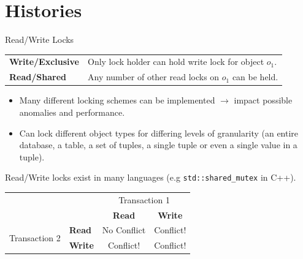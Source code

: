 \section{Histories}
\begin{definitionbox}{Read/Write Locks}
    \begin{center}
        \begin{tabular}{l p{}}
            \textbf{Write/Exclusive}  & Only lock holder can hold write lock for object $o_1$. \\
            \textbf{Read/Shared}  & Any number of other read locks on $o_1$ can be held. \\
        \end{tabular}
    \end{center}
    \begin{itemize}
        \item Many different locking schemes can be implemented $\to$ impact possible anomalies and performance.
        \item Can lock different object types for differing levels of granularity (an entire database, a table, a set of tuples, a single tuple or even a single value in a tuple).
    \end{itemize}
    Read/Write locks exist in many languages (e.g \texttt{std::shared_mutex} in C++).
    \begin{center}
        \begin{tabular}{ r l c c}
            &                & \multicolumn{2}{c}{Transaction 1} \\
            &                & \textbf{Read} & \textbf{Write} \\
            \multirow{2}{*}{Transaction 2}& \textbf{Read}  & No Conflict & Conflict! \\
            & \textbf{Write} & Conflict! & Conflict! \\
        \end{tabular}
    \end{center}
\end{definitionbox}

